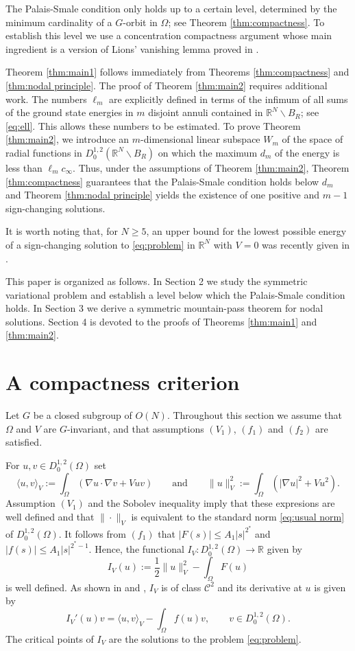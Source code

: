 \documentclass[10pt,letterpaper]{article}
\numberwithin{equation}{section}
\def\r{\mathbb{R}}
\def\rn{\mathbb{R}^N}
\def\io{\int_{\Omega}}
\def\o{\Omega}
\def\cC{\mathcal{C}}
\begin{document}
The Palais-Smale condition only holds up to a certain level, determined by the minimum cardinality of a $G$-orbit in $\o$; see Theorem \ref{thm:compactness}. To establish this level we use a concentration compactness argument whose main ingredient is a version of Lions' vanishing lemma proved in \cite{cm}.

Theorem \ref{thm:main1} follows immediately from Theorems \ref{thm:compactness} and \ref{thm:nodal principle}. The proof of Theorem \ref{thm:main2} requires additional work. The numbers $\ell_m$ are explicitly defined in terms of the infimum of all sums of the ground state energies in $m$ disjoint annuli contained in $\rn\smallsetminus B_R$; see \eqref{eq:ell}. This allows these numbers to be estimated. To prove Theorem \ref{thm:main2}, we introduce an $m$-dimensional linear subspace $W_m$ of the space of radial functions in $D^{1,2}_0(\rn\smallsetminus B_R)$ on which the maximum $d_m$ of the energy is less than $\ell_mc_\infty$. Thus, under the assumptions of Theorem \ref{thm:main2}, Theorem \ref{thm:compactness} guarantees that the Palais-Smale condition holds below $d_m$ and Theorem \ref{thm:nodal principle} yields the existence of one positive and $m-1$ sign-changing solutions.

It is worth noting that, for $N\geq 5$, an upper bound for the lowest possible energy of a sign-changing solution to \eqref{eq:problem} in $\rn$ with $V=0$ was recently given in \cite{cmp2}.

This paper is organized as follows. In Section 2 we study the symmetric variational problem and establish a level below which the Palais-Smale condition holds. In Section 3 we derive a symmetric mountain-pass theorem for nodal solutions. Section 4 is devoted to the proofs of Theorems \ref{thm:main1} and \ref{thm:main2}.



\section{A compactness criterion}

Let $G$ be a closed subgroup of $O(N)$. Throughout this section we assume that $\o$ and $V$ are $G$-invariant, and that assumptions $(V_1)$, $(f_1)$ and $(f_2)$ are satisfied. 

For $u,v\in D^{1,2}_0(\o)$ set
$$\langle u,v\rangle_V:=\io(\nabla u\cdot\nabla v+Vuv)\qquad\text{and}\qquad\|u\|_V^2:=\io(|\nabla u|^2+Vu^2).$$
Assumption $(V_1)$ and the Sobolev inequality imply that these expresions are well defined and that $\|\cdot\|_V$ is equivalent to the standard norm \eqref{eq:usual norm} of $D^{1,2}_0(\o)$. It follows from $(f_1)$ that $|F(s)|\leq A_1|s|^{2^*}$ and $|f(s)|\leq A_1|s|^{2^*-1}$. Hence, the functional $I_V:D^{1,2}_0(\o)\to\r$ given by
$$I_V(u):=\frac{1}{2}\|u\|_V^2-\io F(u)$$
is well defined. As shown in \cite[Lemma 2.6]{bm} and \cite[Proposition 3.8]{bpr}, $I_V$ is of class $\cC^2$ and its derivative at $u$ is given by 
$$I_V'(u)v=\langle u,v\rangle_V - \io f(u)v,\qquad v\in D^{1,2}_0(\o).$$
The critical points of $I_V$ are the solutions to the problem \eqref{eq:problem}.
\end{document}
